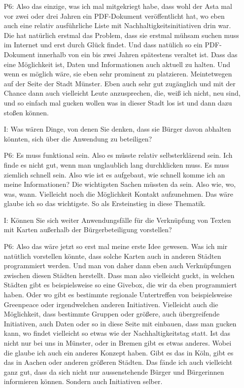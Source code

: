\begin{itemize}
    \item[P6:] Also das einzige, was ich mal mitgekriegt habe, dass wohl der Asta mal vor zwei oder drei Jahren ein PDF-Dokument ver{\"o}ffentlicht hat, wo eben auch eine relativ ausf{\"u}hrliche Liste mit Nachhaltigkeitsinitiativen drin war. Die hat nat{\"u}rlich erstmal das Problem, dass sie erstmal m{\"u}hsam suchen muss im Internet und erst durch Gl{\"u}ck findet. Und dass nat{\"u}lich so ein PDF-Dokument innerhalb von ein bis zwei Jahren sp{\"a}testens veraltet ist. Dass das eine M{\"o}glichkeit ist, Daten und Informationen auch aktuell zu halten. Und wenn es m{\"o}glich w{\"a}re, sie eben sehr prominent zu platzieren. Meintetwegen auf der Seite der Stadt M{\"u}nster. Eben auch sehr gut zug{\"a}nglich und mit der Chance dann auch vielleicht Leute anzusprechen, die, wei{\ss} ich nicht, neu sind, und so einfach mal gucken wollen was in dieser Stadt los ist und dann dazu sto{\ss}en k{\"o}nnen.
    \item[I:] Was w{\"a}ren Dinge, von denen Sie denken, dass sie B{\"u}rger davon abhalten k{\"o}nnten, sich {\"u}ber die Anwendung zu beteiligen?
    \item[P6:] Es muss funktional sein. Also es m{\"u}sste relativ selbsterkl{\"a}rend sein. Ich finde es nicht gut, wenn man unglaublich lang durchklicken muss. Es muss ziemlich schnell sein. Also wie ist es aufgebaut, wie schnell komme ich an meine Informationen? Die wichtigsten Sachen m{\"u}ssten da sein. Also wie, wo, was, wann. Vielleicht noch die M{\"o}glichkeit Kontakt aufzunehmen. Das w{\"a}re glaube ich so das wichtigste. So als Ersteinstieg in diese Thematik.
    \item[I:] K{\"o}nnen Sie sich weiter Anwendungsf{\"a}lle f{\"u}r die Verkn{\"u}pfung von Texten mit Karten au{\ss}erhalb der B{\"u}rgerbeteiligung vorstellen?
    \item[P6:] Also das w{\"a}re jetzt so erst mal meine erste Idee gewesen. Was ich mir nat{\"u}tlich vorstellen k{\"o}nnte, dass solche Karten auch in anderen St{\"a}dten programmiert werden. Und man von daher dann eben auch Verkn{\"u}pfungen zwischen diesen St{\"a}dten herstellt. Dass man also vielleicht guckt, in welchen St{\"a}dten gibt es beispielsweise so eine Givebox, die wir da eben programmiert haben. Oder wo gibt es bestimmte regionale Untertreffen von beispielsweise Greenpeace oder irgendwelchen anderen Initiativen. Vielleicht auch die M{\"o}glichkeit, dass bestimmte Gruppen oder gr{\"o}{\ss}ere, auch {\"u}bergreifende Initiativen, auch Daten	oder so in diese Seite mit einbauen, dass man gucken kann, wo findet vielleicht so etwas wie der Nachhaltigkeitstag statt. Ist das nicht nur bei uns in M{\"u}nster, oder in Bremen gibt es etwas anderes. Wobei die glaube ich auch ein anderes Konzept haben. Gibt es das in K{\"o}ln, gibt es das in Aachen oder anderen gr{\"o}{\ss}eren St{\"a}dten. Das f{\"a}nde ich auch vielleicht ganz gut, dass da sich nicht nur aussenstehende B{\"u}rger und B{\"u}rgerinnen informieren k{\"o}nnen. Sondern auch Initiativen selber.
\end{itemize}

